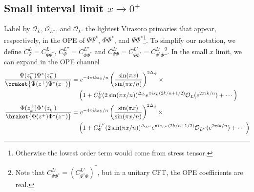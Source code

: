 \documentclass[11pt]{article}
\newcommand{\mO}{\mathcal{O}}
\newcommand{\nn}{\nonumber}
\newcommand{\lb}{\left(}
\newcommand{\rb}{\right)}
\newcommand{\JM}[1]{\textcolor{orange}{#1}}
\begin{document}
\subsection{Small interval limit \texorpdfstring{$x\to 0^+$}{x -> 0+}}
Label by $\mO_L$, $\mO_{L''}$, and $\mO_{L'}$ the lightest Virasoro primaries that appear, respectively, in the OPE of $\Psi \Psi^*$, $\Phi\Phi^*$, and $\Psi\Phi^*$\footnote{Otherwise the lowest order
  term would come from stress tensor.}. 
  To simplify our notation, we define
   $C_{\Psi}^L = C^{L}_{\Psi\Psi^*}$, $C_{\Phi}^{L''} = C^{L''}_{\Phi\Phi^*}$ and $C_{\Psi \Phi}^{L'} = C^{L'}_{\Psi \Phi^*}=C^{L'}_{\Psi^*\Phi}$\footnote{Note that $C^{L'}_{\Psi\Phi^*}=(C^{L'}_{\Psi^*\Phi})^*$, but in a unitary CFT, the OPE coefficients are real.}.
   In the small $x$ limit, we can expand in the OPE
  channel
  \begin{align}
    \frac{\Psi(z_{k}^{+})\Psi^*(z_{k}^{-})}{\braket{\Psi(z^+)\Psi^*(z^-)}}&=e^{-4\pi i k s_{\Psi}/n}\lb
    \frac{\sin(\pi x)}{\sin(\pi x/n)}\rb^{2\Delta_{\Psi}}\times\nn \\
    &\quad\lb  1+ C_{\Psi}^L(2\sin(\pi x/n))^{\Delta_L}e^{\pi i s_L(2k/n+1/2)}\mO_L(e^{2\pi i k/n})+\cdots\rb  \\
    \frac{\Phi(z_{k}^{+})\Phi^*(z_{k}^{-})}{\braket{\Phi(z^+)\Phi^*(z^-)}}&=e^{-4\pi i k s_{\Phi}/n}\lb
    \frac{\sin(\pi x)}{\sin(\pi x/n)}\rb^{2\Delta_{\Phi}}\times\nn\\
    &\quad\lb  1+ C_{\Phi}^{L''}(2\sin(\pi x/n))^{\Delta_{L''}}e^{\pi i s_{L''}(2k/n+1/2)}\mO_{L''}(e^{2\pi i k/n})+\cdots\rb 
  \end{align}
\end{document}
